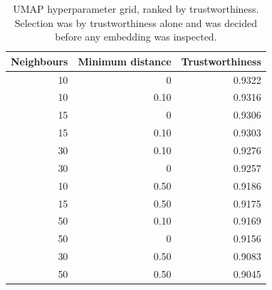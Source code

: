 \begin{table}[t]
\centering
\small
\caption{UMAP hyperparameter grid, ranked by trustworthiness. Selection was by trustworthiness alone and was decided before any embedding was inspected.}
\label{tab:umapgrid}
\begin{tabular}{rrr}
\toprule
Neighbours & Minimum distance & Trustworthiness \\
\midrule
10 & 0 & 0.9322 \\
10 & 0.10 & 0.9316 \\
15 & 0 & 0.9306 \\
15 & 0.10 & 0.9303 \\
30 & 0.10 & 0.9276 \\
30 & 0 & 0.9257 \\
10 & 0.50 & 0.9186 \\
15 & 0.50 & 0.9175 \\
50 & 0.10 & 0.9169 \\
50 & 0 & 0.9156 \\
30 & 0.50 & 0.9083 \\
50 & 0.50 & 0.9045 \\
\bottomrule
\end{tabular}
\end{table}
